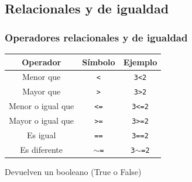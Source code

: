 \subsection{Relacionales y de igualdad}
\begin{frame}[label=oper_relacionales]
 \frametitle{Operadores relacionales y de igualdad}
 \begin{center}
 \begin{small}
  \begin{tabular}{|c|c|c|}
  \multicolumn{1}{c}{Operador} & \multicolumn{1}{c}{Símbolo} &
       \multicolumn{1}{c}{Ejemplo} \\ \toprule \hline
  Menor que & \texttt{<} & \texttt{3<2} \\ \hline
  Mayor que & \texttt{>} & \texttt{3>2} \\ \hline
  Menor o igual que & \texttt{<=} & \texttt{3<=2} \\ \hline
  Mayor o igual que & \texttt{>=} & \texttt{3>=2} \\ \hline
  Es igual & \texttt{==} & \texttt{3==2} \\
\hline
  Es diferente & \texttt{$\sim$=} & \texttt{3$\sim$=2} \\ \hline 
  \end{tabular}
 \end{small}
 \end{center}
 Devuelven un \alert{booleano} (True o False)
\end{frame}
